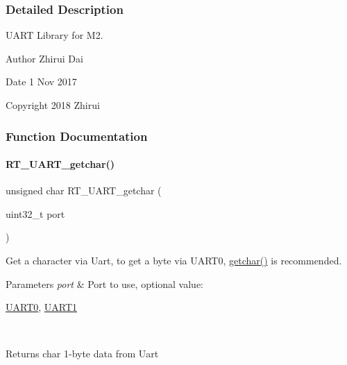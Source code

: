 \subsubsection{Detailed Description}
U\+A\+RT Library for M2. 

\begin{DoxyAuthor}{Author}
Zhirui Dai 
\end{DoxyAuthor}
\begin{DoxyDate}{Date}
1 Nov 2017 
\end{DoxyDate}
\begin{DoxyCopyright}{Copyright}
2018 Zhirui 
\end{DoxyCopyright}


\subsubsection{Function Documentation}
\mbox{\label{a00095_abc136df9d66fe27bf8ffcc319246591e}} 
\paragraph{\texorpdfstring{R\+T\+\_\+\+U\+A\+R\+T\+\_\+getchar()}{RT\_UART\_getchar()}}
{\footnotesize\ttfamily unsigned char R\+T\+\_\+\+U\+A\+R\+T\+\_\+getchar (\begin{DoxyParamCaption}\item[{uint32\+\_\+t}]{port }\end{DoxyParamCaption})}



Get a character via Uart, to get a byte via U\+A\+R\+T0, \mbox{\hyperlink{a00044_a0979671914792955a7a68461634ff82d}{getchar()}} is recommended. 


\begin{DoxyParams}{Parameters}
{\em port} & Port to use, optional value\+:
\begin{DoxyCode}
\mbox{\hyperlink{a00098_a0508661f121639ffdee7de2353a0def2}{UART0}}, \mbox{\hyperlink{a00098_a8d69bf04d07af4fbbab5a8bd291f65ff}{UART1}}
\end{DoxyCode}
 \\
\hline
\end{DoxyParams}
\begin{DoxyReturn}{Returns}
char 1-\/byte data from Uart 
\end{DoxyReturn}
\mbox{\label{a00095_ab0faf051e642e540b1b9c114eae242bd}} 
